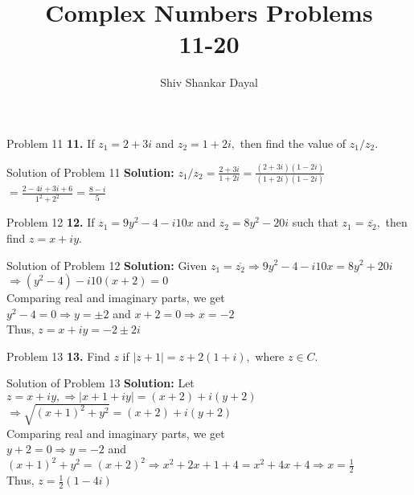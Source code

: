 \documentclass[aspectratio=169,8pt]{beamer}
\title{Complex Numbers Problems\\ 11-20}
\author[Shiv Shankar Dayal]{Shiv Shankar Dayal}
\begin{document}
\begin{frame}
  \titlepage
\end{frame}
\begin{frame}{Problem 11}
  \textbf{11.} If $z_1 = 2 + 3i$ and $z_2 = 1 + 2i,$ then find the value of $z_1/z_2.$
\end{frame}
\begin{frame}{Solution of Problem 11}
  \textbf{Solution:} $z_1/z_2 = \frac{2 + 3i}{1 + 2i} = \frac{(2 + 3i)(1 - 2i)}{(1 + 2i)(1 - 2i)}$\\
  \vspace*{0.2cm}
  $= \frac{2 - 4i + 3i + 6}{1^2 + 2^2} = \frac{8 - i}{5}$
\end{frame}
\begin{frame}{Problem 12}
  \textbf{12.} If $z_1 = 9y^2 - 4 -i10x$ and $z_2 = 8y^2 - 20i$ such that $z_1 = \overline{z_2},$ then find $z = x + iy.$
\end{frame}
\begin{frame}{Solution of Problem 12}
  \textbf{Solution:} Given $z_1 = \overline{z_2}\Rightarrow 9y^2 - 4 -i10x = 8y^2 + 20 i$\\
  \vspace*{0.2cm}
  $\Rightarrow (y^2 - 4) -i10(x + 2) = 0$\\
  \vspace*{0.2cm}
  Comparing real and imaginary parts, we get\\
  \vspace*{0.2cm}
  $y^2 - 4 = 0 \Rightarrow y = \pm 2$ and $x + 2 = 0 \Rightarrow x = -2$\\
  \vspace*{0.2cm}
  Thus, $z = x + iy = -2\pm 2i$
\end{frame}
\begin{frame}{Problem 13}
  \textbf{13.} Find $z$ if $|z + 1| = z + 2(1 + i),$ where $z\in C.$
\end{frame}
\begin{frame}{Solution of Problem 13}
  \textbf{Solution:} Let $z = x + iy, \Rightarrow |x + 1 + iy| = (x + 2) + i(y + 2)$\\
  \vspace*{0.2cm}
  $\Rightarrow \sqrt{(x + 1)^2 + y^2} = (x + 2) + i(y + 2)$\\
  \vspace*{0.2cm}
  Comparing real and imaginary parts, we get\\
  \vspace*{0.2cm}
  $y + 2 = 0 \Rightarrow y = -2$ and $(x + 1)^2 + y^2 = (x + 2)^2 \Rightarrow x^2 + 2x + 1 + 4 = x^2 + 4x + 4 \Rightarrow x = \frac{1}{2}$\\
  \vspace*{0.2cm}
  Thus, $z = \frac{1}{2}(1 - 4i)$
\end{frame}
\end{document}
